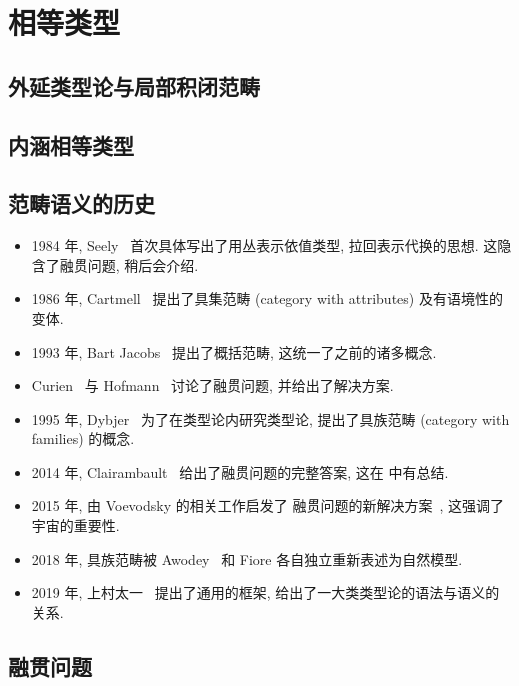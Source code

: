 \section{相等类型}

\subsection{外延类型论与局部积闭范畴}

\subsection{内涵相等类型}

\subsection{范畴语义的历史}


\begin{itemize}
\item 1984 年, Seely~\cite{seely:1984:lccc}
首次具体写出了用丛表示依值类型, 拉回表示代换的思想.
这隐含了融贯问题, 稍后会介绍.
\item 1986 年, Cartmell~\cite{cartmell:1986:contextualcat}
提出了具集范畴 (category with attributes) 及有语境性的变体.
\item 1993 年, Bart Jacobs~\cite{jacobs:1993:comprehensioncat}
提出了概括范畴, 这统一了之前的诸多概念.
\item Curien~\cite{curien:1993:coherence} 与 Hofmann~\cite{hofmann:1995:lccccoh}
讨论了融贯问题, 并给出了解决方案.
\item 1995 年, Dybjer~\cite{dybjer:1995:internal}
为了在类型论内研究类型论, 提出了具族范畴 (category with families) 的概念.
\item 2014 年, Clairambault~\cite{clairambault:2014:biequivalence}
给出了融贯问题的完整答案, 这在 \cite{curien:2014:revisit} 中有总结.
\item 2015 年, 由 Voevodsky 的相关工作启发了
融贯问题的新解决方案~\cite{lumsdaine:2015:universes}, 这强调了宇宙的重要性.
\item 2018 年, 具族范畴被 Awodey~\cite{awodey:2018:natural} 和 Fiore 各自独立重新表述为自然模型.
\item 2019 年, 上村太一~\cite{uemura:2019:general}
提出了通用的框架, 给出了一大类类型论的语法与语义的关系.
\end{itemize}

\subsection{融贯问题}

